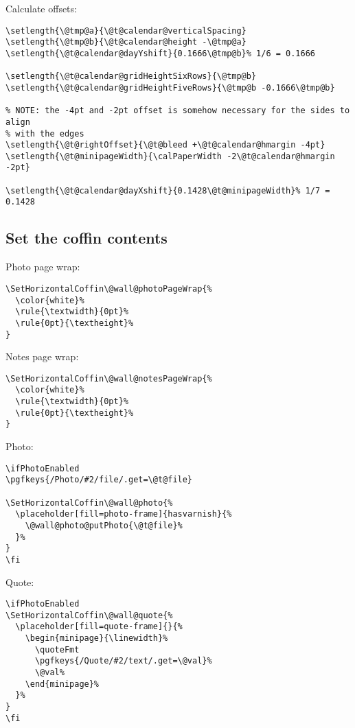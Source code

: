 \documentclass[11pt,oneside]{memoir-article}
\begin{document}
Calculate offsets:

\begin{verbatim}
\setlength{\@tmp@a}{\@t@calendar@verticalSpacing}
\setlength{\@tmp@b}{\@t@calendar@height -\@tmp@a}
\setlength{\@t@calendar@dayYshift}{0.1666\@tmp@b}% 1/6 = 0.1666

\setlength{\@t@calendar@gridHeightSixRows}{\@tmp@b}
\setlength{\@t@calendar@gridHeightFiveRows}{\@tmp@b -0.1666\@tmp@b}

% NOTE: the -4pt and -2pt offset is somehow necessary for the sides to align
% with the edges
\setlength{\@t@rightOffset}{\@t@bleed +\@t@calendar@hmargin -4pt}
\setlength{\@t@minipageWidth}{\calPaperWidth -2\@t@calendar@hmargin -2pt}

\setlength{\@t@calendar@dayXshift}{0.1428\@t@minipageWidth}% 1/7 = 0.1428
\end{verbatim}

\subsection{Set the coffin contents}
\label{sec:orgcf41083}

Photo page wrap:

\begin{verbatim}
\SetHorizontalCoffin\@wall@photoPageWrap{%
  \color{white}%
  \rule{\textwidth}{0pt}%
  \rule{0pt}{\textheight}%
}
\end{verbatim}

Notes page wrap:

\begin{verbatim}
\SetHorizontalCoffin\@wall@notesPageWrap{%
  \color{white}%
  \rule{\textwidth}{0pt}%
  \rule{0pt}{\textheight}%
}
\end{verbatim}

Photo:

\begin{verbatim}
\ifPhotoEnabled
\pgfkeys{/Photo/#2/file/.get=\@t@file}

\SetHorizontalCoffin\@wall@photo{%
  \placeholder[fill=photo-frame]{hasvarnish}{%
    \@wall@photo@putPhoto{\@t@file}%
  }%
}
\fi
\end{verbatim}

Quote:

\begin{verbatim}
\ifPhotoEnabled
\SetHorizontalCoffin\@wall@quote{%
  \placeholder[fill=quote-frame]{}{%
    \begin{minipage}{\linewidth}%
      \quoteFmt
      \pgfkeys{/Quote/#2/text/.get=\@val}%
      \@val%
    \end{minipage}%
  }%
}
\fi
\end{verbatim}
\end{document}
